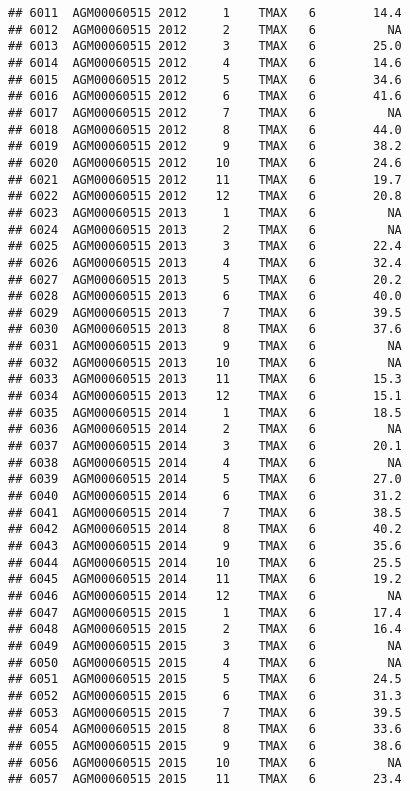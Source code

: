 \documentclass{article}\usepackage[]{graphicx}\usepackage[]{color}
\makeatletter
\newenvironment{kframe}{%
 \def\at@end@of@kframe{}%
 \ifinner\ifhmode%
  \def\at@end@of@kframe{\end{minipage}}%
  \begin{minipage}{\columnwidth}%
 \fi\fi%
 \def\FrameCommand##1{\hskip\@totalleftmargin \hskip-\fboxsep
 \colorbox{shadecolor}{##1}\hskip-\fboxsep
     \hskip-\linewidth \hskip-\@totalleftmargin \hskip\columnwidth}%
 \MakeFramed {\advance\hsize-\width
   \@totalleftmargin\z@ \linewidth\hsize
   \@setminipage}}%
 {\par\unskip\endMakeFramed%
 \at@end@of@kframe}
\newenvironment{knitrout}{}{} %
\makeatother
\begin{document}
\begin{knitrout}
\begin{kframe}
\begin{verbatim}
## 6011  AGM00060515 2012     1    TMAX   6        14.4
## 6012  AGM00060515 2012     2    TMAX   6          NA
## 6013  AGM00060515 2012     3    TMAX   6        25.0
## 6014  AGM00060515 2012     4    TMAX   6        14.6
## 6015  AGM00060515 2012     5    TMAX   6        34.6
## 6016  AGM00060515 2012     6    TMAX   6        41.6
## 6017  AGM00060515 2012     7    TMAX   6          NA
## 6018  AGM00060515 2012     8    TMAX   6        44.0
## 6019  AGM00060515 2012     9    TMAX   6        38.2
## 6020  AGM00060515 2012    10    TMAX   6        24.6
## 6021  AGM00060515 2012    11    TMAX   6        19.7
## 6022  AGM00060515 2012    12    TMAX   6        20.8
## 6023  AGM00060515 2013     1    TMAX   6          NA
## 6024  AGM00060515 2013     2    TMAX   6          NA
## 6025  AGM00060515 2013     3    TMAX   6        22.4
## 6026  AGM00060515 2013     4    TMAX   6        32.4
## 6027  AGM00060515 2013     5    TMAX   6        20.2
## 6028  AGM00060515 2013     6    TMAX   6        40.0
## 6029  AGM00060515 2013     7    TMAX   6        39.5
## 6030  AGM00060515 2013     8    TMAX   6        37.6
## 6031  AGM00060515 2013     9    TMAX   6          NA
## 6032  AGM00060515 2013    10    TMAX   6          NA
## 6033  AGM00060515 2013    11    TMAX   6        15.3
## 6034  AGM00060515 2013    12    TMAX   6        15.1
## 6035  AGM00060515 2014     1    TMAX   6        18.5
## 6036  AGM00060515 2014     2    TMAX   6          NA
## 6037  AGM00060515 2014     3    TMAX   6        20.1
## 6038  AGM00060515 2014     4    TMAX   6          NA
## 6039  AGM00060515 2014     5    TMAX   6        27.0
## 6040  AGM00060515 2014     6    TMAX   6        31.2
## 6041  AGM00060515 2014     7    TMAX   6        38.5
## 6042  AGM00060515 2014     8    TMAX   6        40.2
## 6043  AGM00060515 2014     9    TMAX   6        35.6
## 6044  AGM00060515 2014    10    TMAX   6        25.5
## 6045  AGM00060515 2014    11    TMAX   6        19.2
## 6046  AGM00060515 2014    12    TMAX   6          NA
## 6047  AGM00060515 2015     1    TMAX   6        17.4
## 6048  AGM00060515 2015     2    TMAX   6        16.4
## 6049  AGM00060515 2015     3    TMAX   6          NA
## 6050  AGM00060515 2015     4    TMAX   6          NA
## 6051  AGM00060515 2015     5    TMAX   6        24.5
## 6052  AGM00060515 2015     6    TMAX   6        31.3
## 6053  AGM00060515 2015     7    TMAX   6        39.5
## 6054  AGM00060515 2015     8    TMAX   6        33.6
## 6055  AGM00060515 2015     9    TMAX   6        38.6
## 6056  AGM00060515 2015    10    TMAX   6          NA
## 6057  AGM00060515 2015    11    TMAX   6        23.4

\end{verbatim}
\end{kframe}
\end{knitrout}
\end{document}
